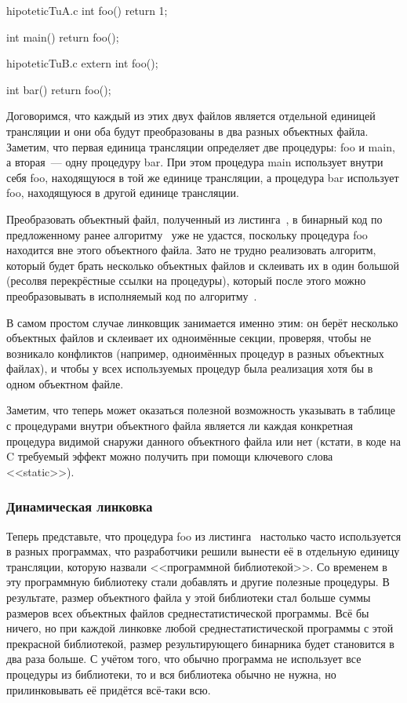\begin{ccode}{hipoteticTuA.c}
int foo()
{
    return 1;
}

int main()
{
    return foo();
}
\end{ccode}

\begin{ccode}{hipoteticTuB.c}
extern int foo();

int bar()
{
    return foo();
}
\end{ccode}

Договоримся, что каждый из этих двух файлов является отдельной единицей трансляции и они оба будут преобразованы в два разных объектных файла.
Заметим, что первая единица трансляции определяет две процедуры: foo и main, а вторая~--- одну процедуру bar.
При этом процедура main использует внутри себя foo, находящуюся в той же единице трансляции, а процедура bar использует foo, находящуюся в другой единице трансляции.

Преобразовать объектный файл, полученный из листинга~, в бинарный код по предложенному ранее алгоритму~ уже не удастся, поскольку процедура foo находится вне этого объектного файла.
Зато не трудно реализовать алгоритм, который будет брать несколько объектных файлов и склеивать их в один большой (ресолвя перекрёстные ссылки на процедуры), который после этого можно преобразовывать в исполняемый код по алгоритму~.

В самом простом случае линковщик занимается именно этим: он берёт несколько объектных файлов и склеивает их одноимённые секции, проверяя, чтобы не возникало конфликтов (например, одноимённых процедур в разных объектных файлах), и чтобы у всех используемых процедур была реализация хотя бы в одном объектном файле.

Заметим, что теперь может оказаться полезной возможность указывать в таблице с процедурами внутри объектного файла является ли каждая конкретная процедура видимой снаружи данного объектного файла или нет (кстати, в коде на C требуемый эффект можно получить при помощи ключевого слова <<static>>).

\subsubsection{Динамическая линковка}
Теперь представьте, что процедура foo из листинга~ настолько часто используется в разных программах, что разработчики решили вынести её в отдельную единицу трансляции, которую назвали <<программной библиотекой>>.
Со временем в эту программную библиотеку стали добавлять и другие полезные процедуры.
В результате, размер объектного файла у этой библиотеки стал больше суммы размеров всех объектных файлов среднестатистической программы.
Всё бы ничего, но при каждой линковке любой среднестатистической программы с этой прекрасной библиотекой, размер результирующего бинарника будет становится в два раза больше.
С учётом того, что обычно программа не использует все процедуры из библиотеки, то и вся библиотека обычно не нужна, но прилинковывать её придётся всё-таки всю.

